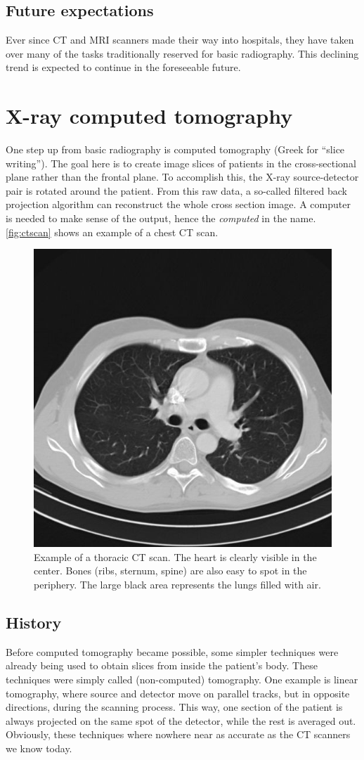 \subsection{Future expectations}
Ever since CT and MRI scanners made their way into hospitals, they have taken
over many of the tasks traditionally reserved for basic radiography. This
declining trend is expected to continue in the foreseeable future.

\section{X-ray computed tomography}
One step up from basic radiography is computed tomography (Greek for ``slice
writing''). The goal here is to create image slices of patients in the
cross-sectional plane rather than the frontal plane. To accomplish this, the X-ray
source-detector pair is rotated around the patient. From this raw data, a
so-called filtered back projection algorithm can reconstruct the whole cross
section image. A computer is needed to make sense of the output, hence the
\emph{computed} in the name. \autoref{fig:ctscan} shows an example of a chest
CT scan.

\begin{figure}[ht]
\begin{center}
  \includegraphics[width=0.4\linewidth]{img/ct-thorax.jpg}
  \caption{Example of a thoracic CT scan. The heart is clearly visible in the
  center. Bones (ribs, sternum, spine) are also easy to spot in the periphery.
  The large black area represents the lungs filled with air.}
  \label{fig:ctscan}
\end{center}
\end{figure}

\subsection{History}
Before computed tomography became possible, some simpler techniques were already
being used to obtain slices from inside the patient's body. These techniques
were simply called (non-computed) tomography. One example is linear tomography,
where source and detector move on parallel tracks, but in opposite directions,
during the scanning process. This way, one section of the patient is always
projected on the same spot of the detector, while the rest is averaged out.
Obviously, these techniques where nowhere near as accurate as the CT scanners we
know today.

